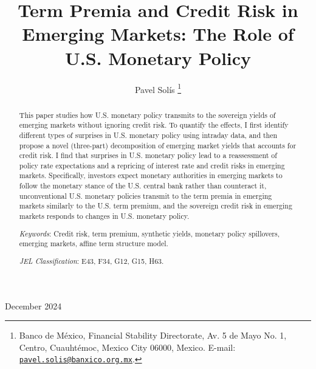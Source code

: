 \documentclass[a4paper, 12pt]{article}
\begin{document}
\title{Term Premia and Credit Risk in Emerging Markets: The Role of U.S. Monetary Policy}
\author{Pavel Solís \hspace{-0.8em} \thanks{\protect\linespread{1}\protect\selectfont Banco de México, Financial Stability Directorate, Av. 5 de Mayo No. 1, Centro, Cuauhtémoc, Mexico City 06000, Mexico. E-mail: \href{mailto:pavel.solis@banxico.org.mx}{\texttt{pavel.solis@banxico.org.mx}}.}	}
\date{}
\maketitle	\vspace{-4ex}
\begin{center}
	December 2024
\end{center}

\begin{abstract}
	This paper studies how U.S. monetary policy transmits to the sovereign yields of emerging markets without ignoring credit risk. To quantify the effects, I first identify different types of surprises in U.S. monetary policy using intraday data, and then propose a novel (three-part) decomposition of emerging market yields that accounts for credit risk. I find that surprises in U.S. monetary policy lead to a reassessment of policy rate expectations and a repricing of interest rate and credit risks in emerging markets. Specifically, investors expect monetary authorities in emerging markets to follow the monetary stance of the U.S. central bank rather than counteract it, unconventional U.S. monetary policies transmit to the term premia in emerging markets similarly to the U.S. term premium, and the sovereign credit risk in emerging markets responds to changes in U.S. monetary policy. 
	
	\vspace{0.5cm}
	\noindent \textit{Keywords}: Credit risk, term premium, synthetic yields, monetary policy spillovers, emerging markets, affine term structure model.
	
	\vspace{0.2cm}
	\noindent \textit{JEL Classification}: E43, F34, G12, G15, H63.
	
	\vfill
	
	\pagebreak
\end{abstract}
\end{document}

